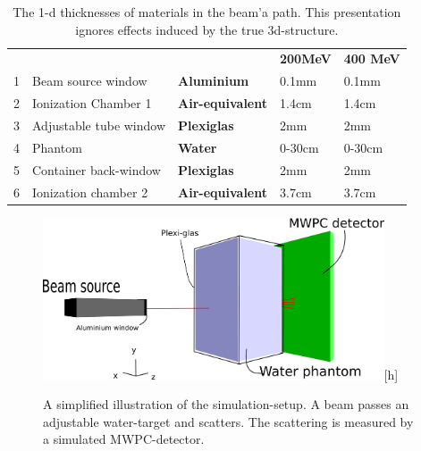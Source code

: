  \begin{table}[h]
\begin{tabular}{lllll} %
 & & & \textbf{200MeV} & \textbf{400 MeV} \\
1&Beam source window &\textbf{Aluminium}&0.1mm& 0.1mm\\
2&Ionization Chamber 1 &\textbf{Air-equivalent}&1.4cm& 1.4cm\\
3&Adjustable tube window &\textbf{Plexiglas}&2mm&2mm\\
4&Phantom &\textbf{Water}&0-30cm& 0-30cm\\
5&Container back-window &\textbf{Plexiglas}&2mm&2mm\\
6&Ionization chamber 2&\textbf{Air-equivalent}&3.7cm& 3.7cm\\
\end{tabular} 
\caption{\label{fig:SimSetup} The 1-d thicknesses of materials in the beam'a path. This presentation ignores effects induced by the true 3d-structure.}
\end{table}


\begin{figure}[ht] 
\begin{center}
\includegraphics[width=0.9\textwidth]{images/SimSetup.png}[h]  
\caption{\label{fig:SimSetup} A simplified illustration of the simulation-setup. A beam passes an adjustable water-target and scatters. The scattering is measured by a simulated MWPC-detector.}
 \end{center}
 \end{figure}

